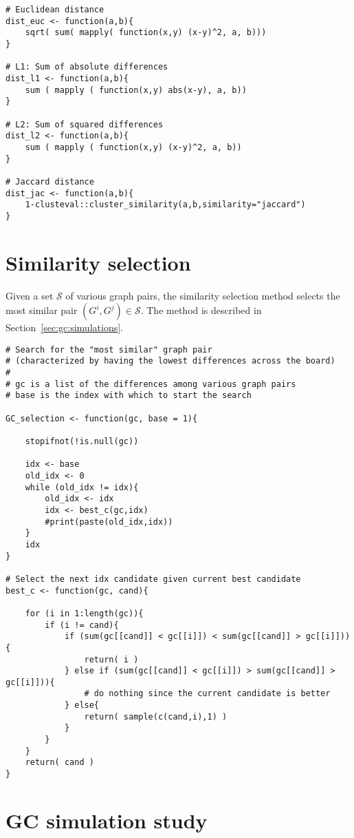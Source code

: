 {\begin{lstlisting}
# Euclidean distance
dist_euc <- function(a,b){
	sqrt( sum( mapply( function(x,y) (x-y)^2, a, b)))
}

# L1: Sum of absolute differences
dist_l1 <- function(a,b){
	sum ( mapply ( function(x,y) abs(x-y), a, b))
}

# L2: Sum of squared differences
dist_l2 <- function(a,b){
	sum ( mapply ( function(x,y) (x-y)^2, a, b))
}

# Jaccard distance
dist_jac <- function(a,b){
	1-clusteval::cluster_similarity(a,b,similarity="jaccard")
}
\end{lstlisting}

}


\section{Similarity selection}
\label{sec:appendicies:gc:similarity}

Given a set $\mathcal{S}$ of various graph pairs, the similarity selection 
method selects the most similar pair $(G^i,G^j) \in \mathcal{S}$. The method is 
described in Section~\ref{sec:gc:simulations}.

{
\begin{lstlisting}
# Search for the "most similar" graph pair
# (characterized by having the lowest differences across the board)
#
# gc is a list of the differences among various graph pairs
# base is the index with which to start the search

GC_selection <- function(gc, base = 1){
	
	stopifnot(!is.null(gc))
	
	idx <- base
	old_idx <- 0
	while (old_idx != idx){
		old_idx <- idx
		idx <- best_c(gc,idx)
		#print(paste(old_idx,idx))
	}
	idx
}

# Select the next idx candidate given current best candidate
best_c <- function(gc, cand){

	for (i in 1:length(gc)){
		if (i != cand){
			if (sum(gc[[cand]] < gc[[i]]) < sum(gc[[cand]] > gc[[i]])){
				return( i )
			} else if (sum(gc[[cand]] < gc[[i]]) > sum(gc[[cand]] > gc[[i]])){
				# do nothing since the current candidate is better
			} else{
				return( sample(c(cand,i),1) )
			}
		}
	}
	return( cand )  
}
\end{lstlisting}
}


\section{GC simulation study}
\label{sec:appendicies:gc:simulations}

